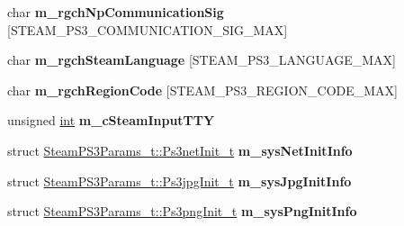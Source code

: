 \begin{DoxyCompactItemize}
\item 
\hypertarget{structSteamPS3Params__t_a6e5fb1aaa0ba2b365fd6a47453267040}{}char {\bfseries m\+\_\+rgch\+Np\+Communication\+Sig} \mbox{[}S\+T\+E\+A\+M\+\_\+\+P\+S3\+\_\+\+C\+O\+M\+M\+U\+N\+I\+C\+A\+T\+I\+O\+N\+\_\+\+S\+I\+G\+\_\+\+M\+A\+X\mbox{]}\label{structSteamPS3Params__t_a6e5fb1aaa0ba2b365fd6a47453267040}

\item 
\hypertarget{structSteamPS3Params__t_a5d0dd7a904368e11406e2d4d0bcecb9f}{}char {\bfseries m\+\_\+rgch\+Steam\+Language} \mbox{[}S\+T\+E\+A\+M\+\_\+\+P\+S3\+\_\+\+L\+A\+N\+G\+U\+A\+G\+E\+\_\+\+M\+A\+X\mbox{]}\label{structSteamPS3Params__t_a5d0dd7a904368e11406e2d4d0bcecb9f}

\item 
\hypertarget{structSteamPS3Params__t_aa510260c607406ab1c5b216be60789ac}{}char {\bfseries m\+\_\+rgch\+Region\+Code} \mbox{[}S\+T\+E\+A\+M\+\_\+\+P\+S3\+\_\+\+R\+E\+G\+I\+O\+N\+\_\+\+C\+O\+D\+E\+\_\+\+M\+A\+X\mbox{]}\label{structSteamPS3Params__t_aa510260c607406ab1c5b216be60789ac}

\item 
\hypertarget{structSteamPS3Params__t_a5a463e30045adee46df0696ed27ad38b}{}unsigned \hyperlink{SDL__thread_8h_a6a64f9be4433e4de6e2f2f548cf3c08e}{int} {\bfseries m\+\_\+c\+Steam\+Input\+T\+T\+Y}\label{structSteamPS3Params__t_a5a463e30045adee46df0696ed27ad38b}

\item 
\hypertarget{structSteamPS3Params__t_a0021f66e51fc9c1bd9c48c69a495916b}{}struct \hyperlink{structSteamPS3Params__t_1_1Ps3netInit__t}{Steam\+P\+S3\+Params\+\_\+t\+::\+Ps3net\+Init\+\_\+t} {\bfseries m\+\_\+sys\+Net\+Init\+Info}\label{structSteamPS3Params__t_a0021f66e51fc9c1bd9c48c69a495916b}

\item 
\hypertarget{structSteamPS3Params__t_ad4930862d9d02a672918cbe22fa4392d}{}struct \hyperlink{structSteamPS3Params__t_1_1Ps3jpgInit__t}{Steam\+P\+S3\+Params\+\_\+t\+::\+Ps3jpg\+Init\+\_\+t} {\bfseries m\+\_\+sys\+Jpg\+Init\+Info}\label{structSteamPS3Params__t_ad4930862d9d02a672918cbe22fa4392d}

\item 
\hypertarget{structSteamPS3Params__t_af612e156f375450f28319eaaeaff13db}{}struct \hyperlink{structSteamPS3Params__t_1_1Ps3pngInit__t}{Steam\+P\+S3\+Params\+\_\+t\+::\+Ps3png\+Init\+\_\+t} {\bfseries m\+\_\+sys\+Png\+Init\+Info}\label{structSteamPS3Params__t_af612e156f375450f28319eaaeaff13db}


\end{DoxyCompactItemize}
